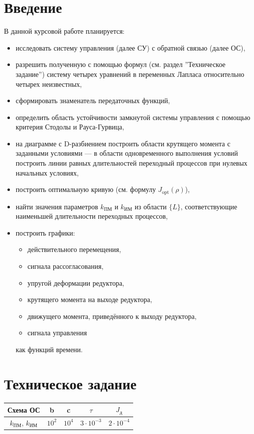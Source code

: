 \documentclass[14pt]{extreport}
\begin{document}
{        \section*{Введение}
В данной курсовой работе планируется:
\begin{itemize}
    \item исследовать систему управления (далее СУ) с обратной связью (далее ОС),
    \item разрешить полученную с помощью формул (см. раздел ”Техническое задание”) систему четырех уравнений в переменных Лапласа относительно четырех неизвестных,
    \item сформировать знаменатель передаточных функций,
    \item определить область устойчивости замкнутой системы управления с помощью критерия Стодолы и Рауса-Гурвица,
    \item на диаграмме с D-разбиением построить области крутящего момента с заданными условиями — в области одновременного выполнения условий построить линии равных длительностей переходный процессов при нулевых начальных условиях,
    \item построить оптимальную кривую (см. формулу $J_{\text{opt}}(\rho)$),
    \item найти значения параметров $k_{\text{ПМ}}$ и $k_{\text{ИМ}}$ из области $\{L\}$, соответствующие наименьшей длительности переходных процессов,
    \item построить графики:
    \begin{itemize}
        \item действительного перемещения,
        \item сигнала рассогласования,
        \item упругой деформации редуктора,
        \item крутящего момента на выходе редуктора,
        \item движущего момента, приведённого к выходу редуктора,
        \item сигнала управления
    \end{itemize}
    как функций времени.
\end{itemize}
        
        \newpage
        \section*{Техническое задание}
\begin{tabular}{|c|c|c|c|c|}
\hline
Схема ОС & b & c & $\tau$ & $J_{\text{д}}$ \\
\hline
$k_{\text{ПМ}}$, $k_{\text{ИМ}}$ & $10^2$ & $10^4$ & $3 \cdot 10^{-3}$ & $2 \cdot 10^{-4}$ \\
\hline
\end{tabular}

}
\end{document}
